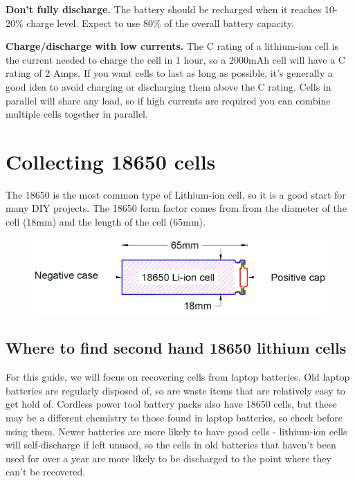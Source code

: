 \documentclass{article}
\theoremstyle{definition}
\theoremstyle{definition}
\theoremstyle{remark}
\begin{document}
    \textbf{Don’t fully discharge.} The battery should be recharged when it reaches 10-20\% charge level. Expect to use 80\% of the overall battery capacity. 

    \textbf{Charge/discharge with low currents.} The C rating of a lithium-ion cell is the current needed to charge the cell in 1 hour, so a 2000mAh cell will have a C rating of 2 Amps. If you want cells to last as long as possible, it’s generally a good idea to avoid charging or discharging them above the C rating. Cells in parallel will share any load, so if high currents are required you can combine multiple cells together in parallel.
  


\section{Collecting 18650 cells} %
\label{sec:collecting_18650_cells}

  The 18650 is the most common type of Lithium-ion cell, so it is a good start for many DIY projects. The 18650 form factor comes from from the diameter of the cell (18mm) and the length of the cell (65mm). 

  \begin{figure}[!ht]
    \centering
    \includegraphics[width=0.5\paperwidth]{Images/image_5_1_(cell_diagram).png}
  \end{figure}

  \subsection{Where to find second hand 18650 lithium cells} %
  \label{sub:where_to_find_second_hand_18650_lithium_cells}

    For this guide, we will focus on recovering cells from laptop batteries. Old laptop batteries are regularly disposed of, so are waste items that are relatively easy to get hold of. Cordless power tool battery packs also have 18650 cells, but these may be a different chemistry to those found in laptop batteries, so check before using them. Newer batteries are more likely to have good cells - lithium-ion cells will self-discharge if left unused, so the cells in old batteries that haven’t been used for over a year are more likely to be discharged to the point where they can’t be recovered.
\end{document}
